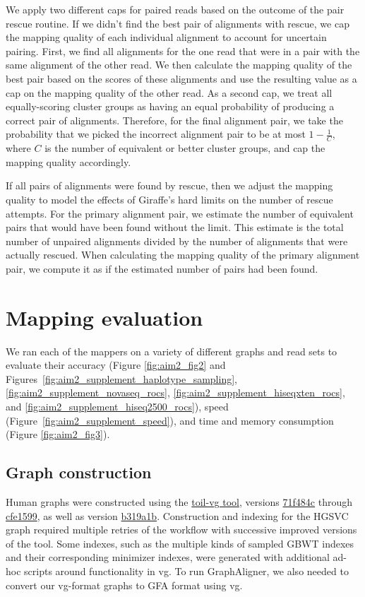 \documentclass[11pt]{ucscthesis}
\newcommand{\toilvgcommit}[2]{\href{https://github.com/vgteam/toil-vg/commit/#1}{#2}}
\begin{document}
We apply two different caps for paired reads based on the outcome of the pair rescue routine.
If we didn't find the best pair of alignments with rescue, we cap the mapping quality of each individual alignment to account for uncertain pairing.
First, we find all alignments for the one read that were in a pair with the same alignment of the other read.
We then calculate the mapping quality of the best pair based on the scores of these alignments and use the resulting value as a cap on the mapping quality of the other read.
As a second cap, we treat all equally-scoring cluster groups as having an equal probability of producing a correct pair of alignments.
Therefore, for the final alignment pair, we take the probability that we picked the incorrect alignment pair to be at most $1 - \frac{1}{C}$, where $C$ is the number of equivalent or better cluster groups, and cap the mapping quality accordingly.


If all pairs of alignments were found by rescue, then we adjust the mapping quality to model the effects of Giraffe's hard limits on the number of rescue attempts.
For the primary alignment pair, we estimate the number of equivalent pairs that would have been found without the limit.
This estimate is the total number of unpaired alignments divided by the number of alignments that were actually rescued.
When calculating the mapping quality of the primary alignment pair, we compute it as if the estimated number of pairs had been found.

\section{Mapping evaluation}

We ran each of the mappers on a variety of different graphs and read sets to evaluate their accuracy (Figure \ref{fig:aim2_fig2} and Figures~\ref{fig:aim2_supplement_haplotype_sampling}, \ref{fig:aim2_supplement_novaseq_rocs}, \ref{fig:aim2_supplement_hiseqxten_rocs}, and \ref{fig:aim2_supplement_hiseq2500_rocs}), speed (Figure~\ref{fig:aim2_supplement_speed}), and time and memory consumption (Figure \ref{fig:aim2_fig3}).


\subsection{Graph construction}
\label{subsec:aim2:graphconstruction}

Human graphs were constructed using the \href{https://github.com/vgteam/toil-vg}{toil-vg tool}, versions \toilvgcommit{71f484ce519bb7eff2941a650638e98b4713b852}{71f484c} through \toilvgcommit{cfe15995a8da67257af1b9aca25fa1a686a839c4}{cfe1599}, as well as version \toilvgcommit{b319a1b22df6dac585b7f95bc1a603577452d443}{b319a1b}. 
Construction and indexing for the HGSVC graph required multiple retries of the workflow with successive improved versions of the tool.
Some indexes, such as the multiple kinds of sampled GBWT indexes and their corresponding minimizer indexes, were generated with additional ad-hoc scripts around functionality in vg.
To run GraphAligner, we also needed to convert our vg-format graphs to GFA format using vg.
\end{document}
